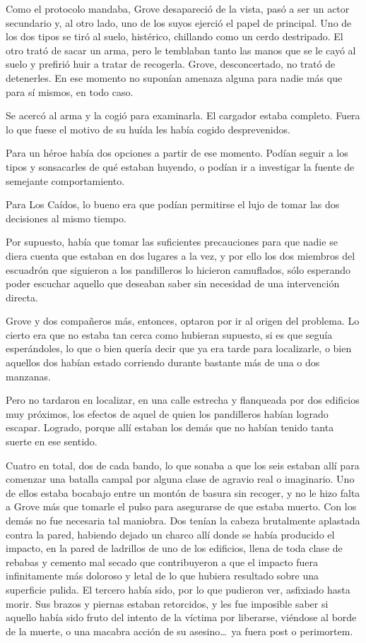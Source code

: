 Como el protocolo mandaba, Grove desapareció de la vista, pasó a ser un actor secundario y, al otro lado, uno de los suyos ejerció el papel de principal. Uno de los dos tipos se tiró al suelo, histérico, chillando como un cerdo destripado. El otro trató de sacar un arma, pero le temblaban tanto las manos que se le cayó al suelo y prefirió huir a tratar de recogerla. Grove, desconcertado, no trató de detenerles. En ese momento no suponían amenaza alguna para nadie más que para sí mismos, en todo caso.

Se acercó al arma y la cogió para examinarla. El cargador estaba completo. Fuera lo que fuese el motivo de su huída les había cogido desprevenidos.

Para un héroe había dos opciones a partir de ese momento. Podían seguir a los tipos y sonsacarles de qué estaban huyendo, o podían ir a investigar la fuente de semejante comportamiento.

Para Los Caídos, lo bueno era que podían permitirse el lujo de tomar las dos decisiones al mismo tiempo.

Por supuesto, había que tomar las suficientes precauciones para que nadie se diera cuenta que estaban en dos lugares a la vez, y por ello los dos miembros del escuadrón que siguieron a los pandilleros lo hicieron camuflados, sólo esperando poder escuchar aquello que deseaban saber sin necesidad de una intervención directa.

Grove y dos compañeros más, entonces, optaron por ir al origen del problema. Lo cierto era que no estaba tan cerca como hubieran supuesto, si es que seguía esperándoles, lo que o bien quería decir que ya era tarde para localizarle, o bien aquellos dos habían estado corriendo durante bastante más de una o dos manzanas.

Pero no tardaron en localizar, en una calle estrecha y flanqueada por dos edificios muy próximos, los efectos de aquel de quien los pandilleros habían logrado escapar. Logrado, porque allí estaban los demás que no habían tenido tanta suerte en ese sentido.

Cuatro en total, dos de cada bando, lo que sonaba a que los seis estaban allí para comenzar una batalla campal por alguna clase de agravio real o imaginario. Uno de ellos estaba bocabajo entre un montón de basura sin recoger, y no le hizo falta a Grove más que tomarle el pulso para asegurarse de que estaba muerto. Con los demás no fue necesaria tal maniobra. Dos tenían la cabeza brutalmente aplastada contra la pared, habiendo dejado un charco allí donde se había producido el impacto, en la pared de ladrillos de uno de los edificios, llena de toda clase de rebabas y cemento mal secado que contribuyeron a que el impacto fuera infinitamente más doloroso y letal de lo que hubiera resultado sobre una superficie pulida. El tercero había sido, por lo que pudieron ver, asfixiado hasta morir. Sus brazos y piernas estaban retorcidos, y les fue imposible saber si aquello había sido fruto del intento de la víctima por liberarse, viéndose al borde de la muerte, o una macabra acción de su asesino\dots\ ya fuera post o perimortem.

